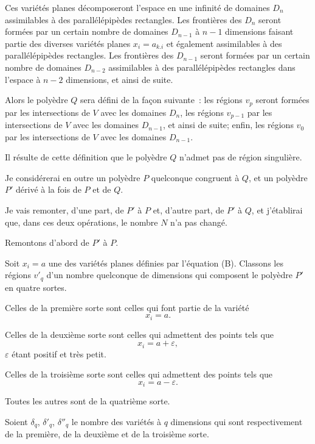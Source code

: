 \documentclass{article}
\begin{document}
Ces variétés planes décomposeront l'espace en une infinité de domaines $D_{n}$ assimilables à des parallélépipèdes rectangles. Les frontières des $D_{n}$ seront formées par un certain nombre de domaines $D_{n-1}$ à $n - 1$ dimensions faisant partie des diverses variétés planes $x_{i} = a_{k.i}$ et également assimilables à des parallélépipèdes rectangles. Les frontières des $D_{n-1}$ seront formées par un certain nombre de domaines $D_{n-2}$ assimilables à des parallélépipèdes rectangles dans l'espace à $n - 2$ dimensions, et ainsi de suite.

Alors le polyèdre $Q$ sera défini de la façon suivante~: les régions $v_{p}$ seront formées par les intersections de $V$ avec les domaines $D_{n}$, les régions $v_{p-1}$ par les intersections de $V$ avec les domaines $D_{n-1}$, et ainsi de suite; enfin, les régions $v_{0}$ par les intersections de $V$ avec les domaines $D_{n-1}$.

Il résulte de cette définition que le polyèdre $Q$ n'admet pas de région singulière.

Je considérerai en outre un polyèdre $P$ quelconque congruent à $Q$, et un polyèdre $P'$ dérivé à la fois de $P$ et de $Q$.

Je vais remonter, d'une part, de $P'$ à $P$ et, d'autre part, de $P'$ à $Q$, et j'établirai que, dans ces deux opérations, le nombre $N$ n'a pas changé.

Remontons d'abord de $P'$ à $P$.

Soit $x_{i} = a$ une des variétés planes définies par l'équation (B). Classons les régions $v'_{q}$ d'un nombre quelconque de dimensions qui composent le polyèdre $P'$ en quatre sortes.

Celles de la première sorte sont celles qui font partie de la variété
\[ x_{i} = a. \]

Celles de la deuxième sorte sont celles qui admettent des points tels que
\[ x_{i} = a + \varepsilon, \]
$\varepsilon$ étant positif et très petit.

Celles de la troisième sorte sont celles qui admettent des points tels que
\[ x_{i} = a - \varepsilon. \]

Toutes les autres sont de la quatrième sorte.

Soient $\delta_{q}$, $\delta'_{q}$, $\delta''_{q}$ le nombre des variétés à $q$ dimensions qui sont respectivement de la première, de la deuxième et de la troisième sorte.
\end{document}
